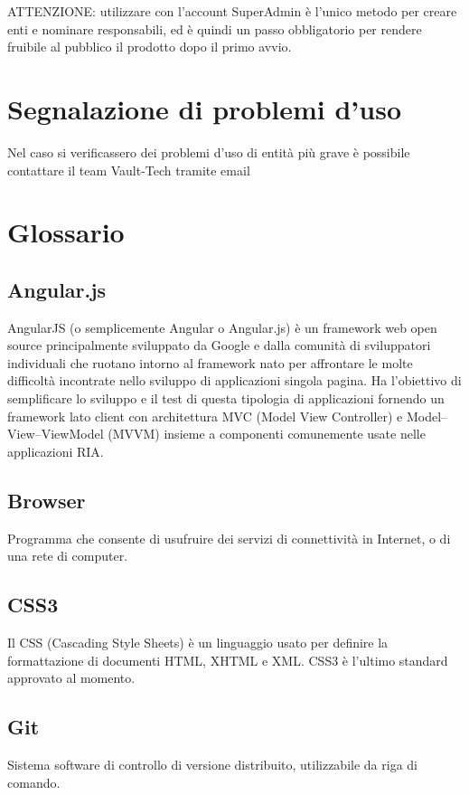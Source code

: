 \documentclass[a4paper, titlepage]{article}
\begin{document}
	ATTENZIONE: utilizzare con l'account SuperAdmin è l'unico metodo per creare enti e nominare responsabili, ed è quindi un passo obbligatorio per rendere fruibile al pubblico il prodotto dopo il primo avvio.
	
	\section{Segnalazione di problemi d'uso}
	Nel caso si verificassero dei problemi d'uso di entità più grave è possibile contattare il team Vault-Tech tramite email 
	
	
	\newpage
	\appendix
	
	\section{Glossario}
	\label{gl} 
	
	\subsection{Angular.js}
	AngularJS (o semplicemente Angular o Angular.js) è un framework web open source principalmente sviluppato da Google e dalla comunità di sviluppatori individuali che ruotano intorno al framework nato per affrontare le molte difficoltà incontrate nello sviluppo di applicazioni singola pagina. Ha l'obiettivo di semplificare lo sviluppo e il test di questa tipologia di applicazioni fornendo un framework lato client con architettura MVC (Model View Controller) e Model–View–ViewModel (MVVM) insieme a componenti comunemente usate nelle applicazioni RIA.
	
	\subsection{Browser}
	Programma che consente di usufruire dei servizi di connettività in Internet, o di una rete di computer.
	
	\subsection{CSS3}
	Il CSS (Cascading Style Sheets) è un linguaggio usato per definire la formattazione di documenti HTML, XHTML e XML. CSS3 è l’ultimo standard approvato al momento.
	
	\subsection{Git}
	Sistema software di controllo di versione distribuito, utilizzabile da riga di comando.
	
\end{document}
